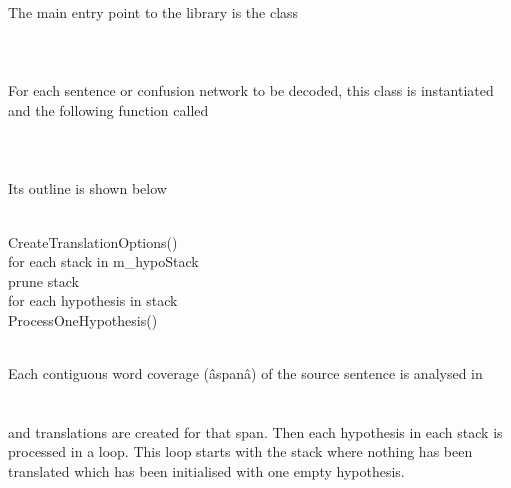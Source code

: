\documentclass[10pt]{report}
\theoremstyle{plain}
\begin{document}
{The main entry point to the library is the class\\
\\
\\
\\
For each sentence or confusion network to be decoded, this class is instantiated and the following function called\\
\\
\\
\\
Its outline is shown below\\
\\
\begin{tt}
\indent CreateTranslationOptions()\\
\indent for each stack in m\_hypoStack\\
\indent \indent prune stack\\
\indent \indent for each hypothesis in stack\\
\indent \indent \indent ProcessOneHypothesis()\\
\end{tt}\\
Each contiguous word coverage (âspanâ) of the source sentence is analysed in\\ 
\\
\\
and translations are created for that span. Then each hypothesis in each stack is processed in a loop. This loop starts with the stack where nothing has been translated which has been initialised with one empty hypothesis.
\\
}
\end{document}

